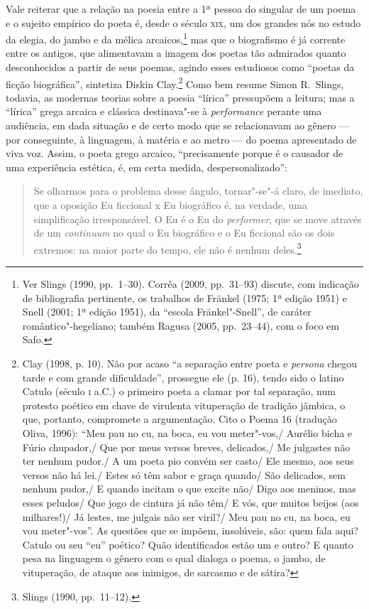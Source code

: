 Vale reiterar que a relação na poesia entre a 1ª pessoa do
singular de um poema e o sujeito empírico do poeta é, desde o século \textsc{xix}, um
dos grandes nós no estudo da elegia, do jambo e da mélica arcaicos,\footnote{
Ver Slings (1990, pp.~1--30). Corrêa (2009, pp.~31--93) discute, com indicação de
bibliografia pertinente, os trabalhos de Fränkel (1975; 1ª edição
1951) e Snell (2001; 1ª edição 1951), da “escola Fränkel"-Snell”, de
caráter romântico"-hegeliano; também Ragusa (2005, pp.~23--44), com o foco em
Safo.} mas que o biografismo é já corrente entre os antigos, que alimentavam a
imagem dos poetas tão admirados quanto desconhecidos a partir de seus poemas,
agindo esses estudiosos como “poetas da ficção biográfica”, sintetiza Diskin
Clay.\footnote{ Clay (1998, p. 10). Não por acaso “a separação entre poeta e
\textit{persona} chegou tarde e com grande dificuldade”, prossegue ele (p. 16),
tendo sido o latino Catulo (século \textsc{i} a.C.) o primeiro poeta a clamar por tal
separação, num protesto poético em chave de virulenta vituperação de tradição
jâmbica, o que, portanto, compromete a argumentação. Cito o Poema 16 (tradução
Oliva, 1996): ``Meu pau no cu, na boca, eu vou meter"-vos,/ Aurélio bicha
e Fúrio chupador,/ Que por meus versos breves, delicados,/ Me julgastes não
ter nenhum pudor./ A um poeta pio convém ser casto/ Ele mesmo, aos seus
versos não há lei./ Estes só têm sabor e graça quando/ São delicados, sem
nenhum pudor,/ E quando incitam o que excite não/ Digo aos meninos, mas esses
peludos/ Que jogo de cintura já não têm/ E vós, que muitos beijos (aos
milhares!)/ Já lestes, me julgais não ser viril?/ Meu pau no cu, na boca, eu
vou meter"-vos''. As questões que se impõem, insolúveis, são: quem fala
aqui? Catulo ou seu “eu” poético? Quão identificados estão um e outro? E quanto
pesa na linguagem o gênero com o qual dialoga o poema, o jambo, de vituperação,
de ataque aos inimigos, de sarcasmo e de sátira?} Como bem resume Simon R.~Slings, 
todavia, as modernas teorias sobre a poesia “lírica”
pressupõem a leitura; mas a “lírica” grega arcaica e clássica destinava"-se à
\textit{performance} perante uma audiência, em dada situação e de certo modo
que se relacionavam ao gênero --- por conseguinte, à linguagem, à matéria e ao
metro --- do poema apresentado de viva voz. Assim, o poeta grego arcaico,
“precisamente porque é o causador de uma experiência estética, é, em certa
medida, despersonalizado”:

\begin{quote}
Se olharmos para o problema desse ângulo, tornar"-se"-á claro, de imediato, que
a oposição Eu ficcional x Eu biográfico é, na verdade, uma simplificação
irresponsável. O Eu é o Eu do \textit{performer}, que se move através de um
\textit{continuum} no qual o Eu biográfico e o Eu ficcional são os dois
extremos: na maior parte do tempo, ele não é nenhum deles.\footnote{ Slings (1990, pp.~11--12).}
\end{quote}

